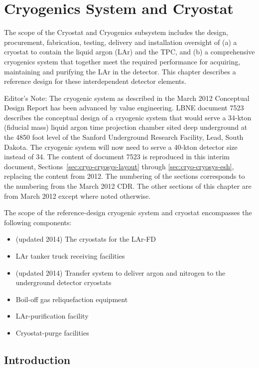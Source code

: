 \chapter{Cryogenics System and Cryostat}
\label{ch:cryo-cryosys}

The scope of the Cryostat and Cryogenics subsystem includes the design, procurement, fabrication, testing, delivery and installation oversight of (a) a cryostat to contain the
liquid argon (LAr) and the TPC, and (b) a comprehensive cryogenics system that together meet the required performance for acquiring, maintaining and purifying the
LAr in the detector.  This chapter describes a reference design for these interdependent detector elements.

\begin{editornote}
Editor's Note: The cryogenic system as described in the March
2012 Conceptual Design Report has been advanced by value engineering. 
LBNE document 7523 describes the conceptual design of a cryogenic system that would
serve a 34-kton (fiducial mass) liquid argon time projection chamber sited deep underground at
the 4850 foot level of the Sanford Underground Research Facility, Lead, South Dakota. The cryogenic system will now need to serve a 40-kton detector size instead of 34. The content of document 7523 is
reproduced in this interim document, Sections~\ref{sec:cryo-cryosys-layout} through \ref{sec:cryo-cryosys-esh}, 
replacing the content from 2012. The numbering of the sections 
corresponds to the numbering from the March 2012 CDR. The other sections of this chapter are from March 2012 except where noted otherwise. 
\end{editornote}

The scope of the reference-design cryogenic system and cryostat encompasses the following components:

\begin{itemize}
\item (updated 2014) The cryostats for the LAr-FD 
\item LAr tanker truck receiving facilities
\item (updated 2014) Transfer system to deliver argon and nitrogen to the underground detector cryostats
\item Boil-off gas reliquefaction equipment
\item LAr-purification facility
\item Cryostat-purge facilities
\end{itemize}

\section{Introduction}
\label{sec:cryo-cryosys-intro}

